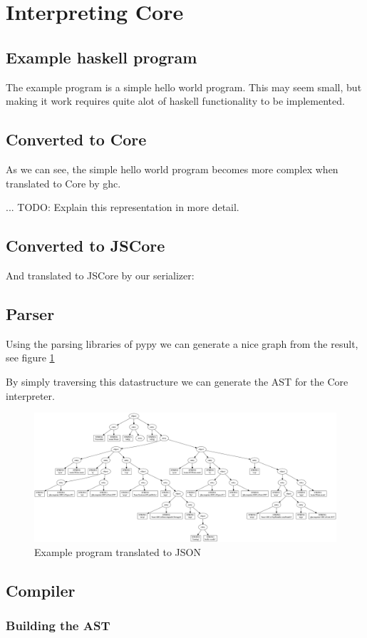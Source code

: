 
\section{Interpreting Core}

\subsection{Example haskell program}

The example program is a simple hello world program. This may seem small, but making it
work requires quite alot of haskell functionality to be implemented.



\subsection{Converted to Core}

As we can see, the simple hello world program becomes more complex when translated
to Core by ghc.



... TODO: Explain this representation in more detail.

\subsection{Converted to JSCore}

And translated to JSCore by our serializer:



\subsection{Parser}

Using the parsing libraries of pypy we can generate a nice graph from the result, 
see figure \ref{fig:helloworldgraph}

By simply traversing this datastructure we can generate the AST for the Core interpreter.

\begin{figure}
\includegraphics[width=\textwidth]{diags/helloworld2.png}
\caption{Example program translated to JSON}
\label{fig:helloworldgraph}
\end{figure}

\subsection{Compiler}

\subsubsection{Building the AST}



